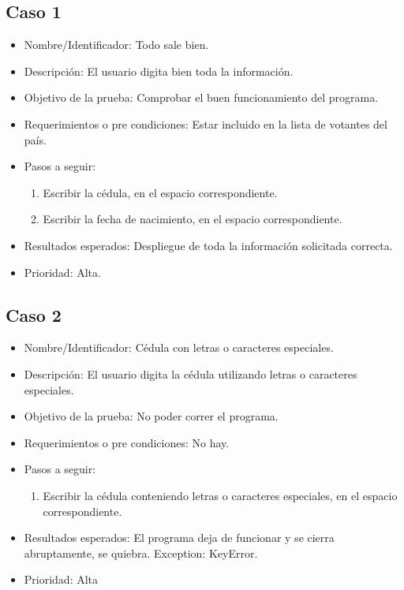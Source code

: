 \documentclass[conference]{IEEEtran}
\begin{document}
\subsection*{Caso 1}
\begin{itemize}
\item Nombre/Identificador: Todo sale bien.
\item Descripción: El usuario digita bien toda la información.
\item Objetivo de la prueba: Comprobar el buen funcionamiento del programa.
\item Requerimientos o pre condiciones: Estar incluido en la lista de votantes del país.
\item Pasos a seguir: 
\begin{enumerate}
\item Escribir la cédula, en el espacio correspondiente.
\item Escribir la fecha de nacimiento, en el espacio correspondiente.
\end{enumerate}
\item Resultados esperados: Despliegue de toda la información solicitada correcta.
\item Prioridad: Alta.
\end{itemize}
\subsection*{Caso 2}
\begin{itemize}
\item Nombre/Identificador: Cédula con letras o caracteres especiales.
\item Descripción: El usuario digita la cédula utilizando letras o caracteres especiales.
\item Objetivo de la prueba: No poder correr el programa.
\item Requerimientos o pre condiciones: No hay.
\item Pasos a seguir: 
\begin{enumerate}
\item Escribir la cédula conteniendo letras o caracteres especiales, en el espacio correspondiente.
\end{enumerate}
\item Resultados esperados: El programa deja de funcionar y se cierra abruptamente, se quiebra. Exception: KeyError.
\item Prioridad: Alta
\end{itemize}
\end{document}
